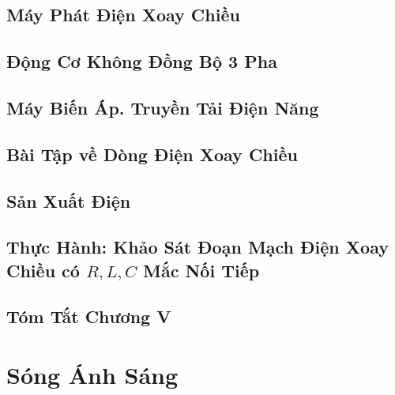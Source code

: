 \documentclass{article}
\numberwithin{equation}{section}
\begin{document}
\subsection{Máy Phát Điện Xoay Chiều}


\subsection{Động Cơ Không Đồng Bộ 3 Pha}


\subsection{Máy Biến Áp. Truyền Tải Điện Năng}


\subsection{Bài Tập về Dòng Điện Xoay Chiều}


\subsection{Sản Xuất Điện}


\subsection{Thực Hành: Khảo Sát Đoạn Mạch Điện Xoay Chiều có $R,L,C$ Mắc Nối Tiếp}


\subsection{Tóm Tắt Chương V}


\section{Sóng Ánh Sáng}
\end{document}
